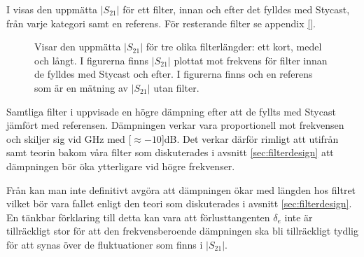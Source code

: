 \documentclass[main.tex]{subfiles}
\begin{document}
I  visas den uppmätta $|S_{21}|$ för ett filter, innan och efter det fylldes med Stycast, från varje kategori samt en referens. För resterande filter se appendix \ref{}.

\begin{figure}[H]
    \centerfloat
    \begin{subfigure}[t]{0.329\textwidth}
        \centerfloat
        \setlength{}
        \setlength\figureheight{11em}
        
    \end{subfigure}
    \begin{subfigure}[t]{0.329\textwidth}
        \centerfloat
        \setlength{}
        \setlength\figureheight{11em}
        
    \end{subfigure}
    \begin{subfigure}[t]{0.329\textwidth}
        \centering
        \setlength{}
        \setlength\figureheight{11em}
        
    \end{subfigure}
    \caption{Visar den uppmätta $|S_{21}|$ för tre olika filterlängder: ett kort, medel och långt. I figurerna finns $|S_{21}|$ plottat mot frekvens för filter innan de fylldes med Stycast och efter. I figurerna finns och en referens som är en mätning av $|S_{21}|$ utan filter.}
    \label{fig:filter_kar}
\end{figure}

Samtliga filter i  uppvisade en högre dämpning efter att de fyllts med Stycast jämfört med referensen. Dämpningen verkar vara proportionell mot frekvensen och skiljer sig vid \unit[50]{GHz} med \unit[$\approx-10$]{dB}. Det verkar därför rimligt att utifrån  samt teorin bakom våra filter som diskuterades i avsnitt \ref{sec:filterdesign} att dämpningen bör öka ytterligare vid högre frekvenser.


Från  kan man inte definitivt avgöra att dämpningen ökar med längden hos filtret vilket bör vara fallet enligt den teori som diskuterades i avsnitt \ref{sec:filterdesign}. En tänkbar förklaring till detta kan vara att förlusttangenten $\delta_e$ inte är tillräckligt stor för att den frekvensberoende dämpningen ska bli tillräckligt tydlig för att synas över de fluktuationer som finns i $|S_{21}|$.%
\end{document}
